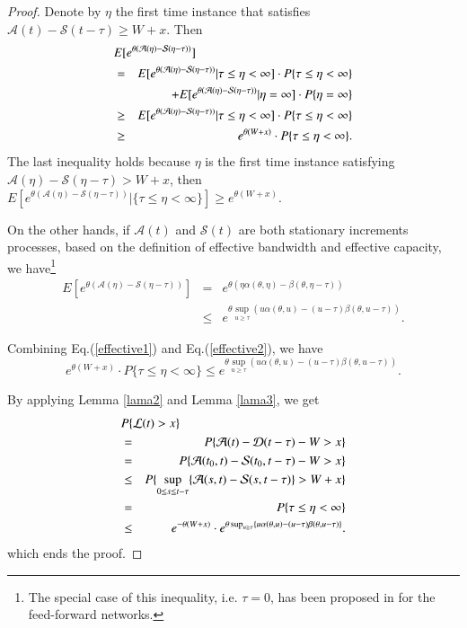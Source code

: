 \documentclass[paper]{ieice}
\newtheorem{proof}{Proof}
\begin{document}
\begin{proof}
Denote by $\eta$ the first time instance that satisfies $\mathcal{A}(t)-\mathcal{S}(t-\tau)\geq W+x$. Then
\begin{eqnarray}\label{effective1}
  \lefteqn{E[e^{\theta(\mathcal{A}(\eta)-\mathcal{S}(\eta-\tau))}]}\nonumber\\
  &=&E[e^{\theta(\mathcal{A}(\eta)-\mathcal{S}(\eta-\tau))}|\tau\leq\eta<\infty]\cdot P\{\tau\leq \eta<\infty\}\nonumber\\
  &&+E[e^{\theta(\mathcal{A}(\eta)-\mathcal{S}(\eta-\tau))}|\eta=\infty]\cdot P\{\eta=\infty\}\nonumber\\
  &\geq& E[e^{\theta(\mathcal{A}(\eta)-\mathcal{S}(\eta-\tau))}|\tau\leq\eta<\infty]\cdot P\{\tau\leq \eta<\infty\}\nonumber\\
  &\geq& e^{\theta (W+x)}\cdot P\{\tau\leq \eta<\infty\}.
\end{eqnarray}
The last inequality holds because $\eta$ is the first time instance satisfying $\mathcal{A}(\eta)-\mathcal{S}(\eta-\tau)>W+x$, then
$E[e^{\theta(\mathcal{A}(\eta)-\mathcal{S}(\eta-\tau))}|\{\tau\leq\eta<\infty\}]\geq e^{\theta (W+x)}$.

On the other hands, if $\mathcal{A}(t)$ and $\mathcal{S}(t)$ are both stationary increments processes, based on the definition of effective bandwidth and effective capacity, we have\footnote{The special case of this inequality, i.e. $\tau=0$, has been proposed in \cite{5984844} for the feed-forward networks.}
\begin{eqnarray}\label{effective2}
E[e^{\theta(\mathcal{A}(\eta)-\mathcal{S}(\eta-\tau))}]&=&e^{\theta(\eta\alpha(\theta,\eta)-\beta(\theta,\eta-\tau))}\nonumber\\
&\leq& e^{\theta\sup_{u\geq \tau}(u\alpha(\theta,u)-(u-\tau)\beta(\theta,u-\tau))}.
\end{eqnarray}

Combining Eq.(\ref{effective1}) and Eq.(\ref{effective2}), we have
$$e^{\theta (W+x)}\cdot P\{\tau\leq\eta<\infty\}\leq e^{\theta\sup_{u\geq \tau}(u\alpha(\theta,u)-(u-\tau)\beta(\theta,u-\tau))}.$$

By applying Lemma \ref{lama2} and Lemma \ref{lama3}, we get
\begin{eqnarray*}
\lefteqn{P\{\mathcal{L}(t)>x\}}\\
&=&P\{\mathcal{A}(t)-\mathcal{D}(t-\tau)-W>x\}\\
&=&P\{\mathcal{A}(t_0,t)-\mathcal{S}(t_0,t-\tau)-W>x\}\\
&\leq&P\{\sup_{0\leq s\leq t-\tau}\{\mathcal{A}(s,t)-\mathcal{S}(s,t-\tau)\}>W+x\}\\
&=&P\{\tau\leq \eta<\infty\}\\
&\leq& e^{-\theta (W+x)}\cdot e^{\theta\sup_{u\geq \tau}\{u\alpha(\theta,u)-(u-\tau)\beta(\theta,u-\tau)\}}.
\end{eqnarray*}
which ends the proof.\QED
\end{proof}
\end{document}
